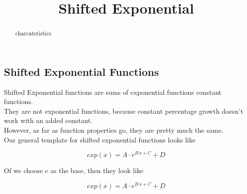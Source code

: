 \documentclass{ximera}
\title{Shifted Exponential}
\begin{document}
\begin{abstract}
charcateristics
\end{abstract}
\maketitle












\subsection*{Shifted Exponential Functions}


Shifted Exponential functions are sums of exponential functions constant functions. \\

They are not exponential functions, because constant percentage growth doesn't work with an  added constant. \\

However, as far as function properties go, they are pretty much the same. \\





Our general template for shifted exponential functions looks like

\[
exp(x) = A \cdot r^{B \, x + C} + D
\]

Of we choose $e$ as the base, then they look like


\[
exp(x) = A \cdot e^{B \, x + C} + D
\]
\end{document}
